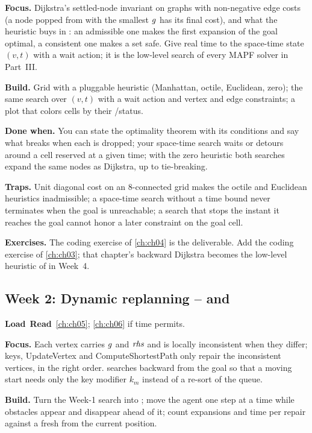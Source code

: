 \textbf{Focus.} Dijkstra's settled-node invariant on graphs with non-negative edge costs (a
node popped from \Open with the smallest $g$ has its final cost), and what the heuristic buys in \astar: an admissible
one makes the first expansion of the goal optimal, a consistent one makes a \Closed set safe.
Give real time to the space-time state $(v,t)$ with a wait action; it is the low-level search
of every MAPF solver in Part~III.

\textbf{Build.} Grid \astar with a pluggable heuristic (Manhattan, octile, Euclidean, zero);
the same search over $(v,t)$ with a wait action and vertex and edge constraints; a plot that
colors cells by their \Open/\Closed status.

\textbf{Done when.} You can state the optimality theorem with its conditions and say what
breaks when each is dropped; your space-time search waits or detours around a cell reserved
at a given time; with the zero heuristic both searches expand the same nodes as Dijkstra, up to tie-breaking.

\textbf{Traps.} Unit diagonal cost on an 8-connected grid makes the octile and Euclidean
heuristics inadmissible; a space-time search without a time bound never terminates when the
goal is unreachable; a search that stops the instant it reaches the goal cannot honor a
later constraint on the goal cell.

\textbf{Exercises.} The coding exercise of \cref{ch:ch04} is the deliverable. Add the coding
exercise of \cref{ch:ch03}; that chapter's backward Dijkstra becomes the low-level heuristic
of \cbs in Week~4.

\subsection{Week 2: Dynamic replanning -- \lpastar and \dstarlite}
\label{sec:appA-week02}
\noindent\textbf{Load}\ \quad\textbf{Read}\ \cref{ch:ch05}; \cref{ch:ch06}
if time permits.

\textbf{Focus.} Each vertex carries $g$ and $\mathit{rhs}$ and is locally inconsistent when they
differ; keys, UpdateVertex and ComputeShortestPath only repair the inconsistent vertices, in
the right order. \dstarlite searches backward from the goal so that a moving start needs
only the key modifier $k_m$ instead of a re-sort of the queue.

\textbf{Build.} Turn the Week-1 search into \dstarlite; move the agent one step at a time
while obstacles appear and disappear ahead of it; count expansions and time per repair
against a fresh \astar from the current position.

